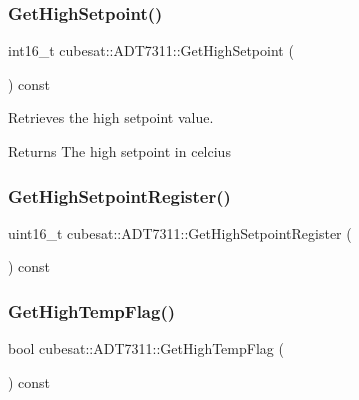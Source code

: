 \subsubsection{\texorpdfstring{Get\+High\+Setpoint()}{GetHighSetpoint()}}
{\footnotesize\ttfamily int16\+\_\+t cubesat\+::\+A\+D\+T7311\+::\+Get\+High\+Setpoint (\begin{DoxyParamCaption}{ }\end{DoxyParamCaption}) const\hspace{0.3cm}{\ttfamily [inline]}}



Retrieves the high setpoint value. 

\begin{DoxyReturn}{Returns}
The high setpoint in celcius 
\end{DoxyReturn}
\mbox{\label{classcubesat_1_1ADT7311_a97830a383f0149caf364a5e135d75835}} 
\subsubsection{\texorpdfstring{Get\+High\+Setpoint\+Register()}{GetHighSetpointRegister()}}
{\footnotesize\ttfamily uint16\+\_\+t cubesat\+::\+A\+D\+T7311\+::\+Get\+High\+Setpoint\+Register (\begin{DoxyParamCaption}{ }\end{DoxyParamCaption}) const\hspace{0.3cm}{\ttfamily [inline]}}

\mbox{\label{classcubesat_1_1ADT7311_a7c4ec1475995dd4461ad8813eeebc384}} 
\subsubsection{\texorpdfstring{Get\+High\+Temp\+Flag()}{GetHighTempFlag()}}
{\footnotesize\ttfamily bool cubesat\+::\+A\+D\+T7311\+::\+Get\+High\+Temp\+Flag (\begin{DoxyParamCaption}{ }\end{DoxyParamCaption}) const\hspace{0.3cm}{\ttfamily [inline]}}



